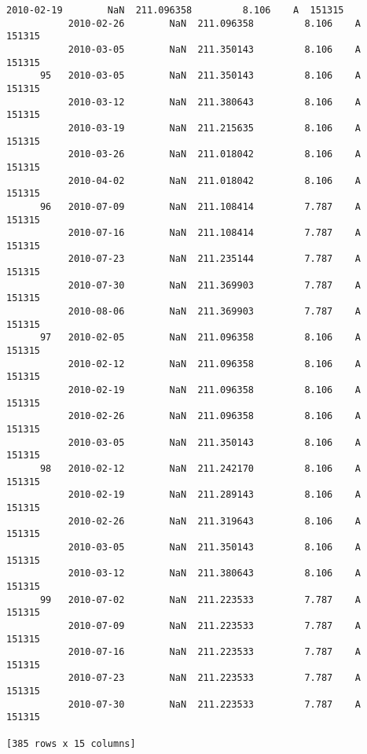 \documentclass[11pt]{article}
\begin{document}
\begin{Verbatim}[commandchars=\\\{\}]
           2010-02-19        NaN  211.096358         8.106    A  151315  
           2010-02-26        NaN  211.096358         8.106    A  151315  
           2010-03-05        NaN  211.350143         8.106    A  151315  
      95   2010-03-05        NaN  211.350143         8.106    A  151315  
           2010-03-12        NaN  211.380643         8.106    A  151315  
           2010-03-19        NaN  211.215635         8.106    A  151315  
           2010-03-26        NaN  211.018042         8.106    A  151315  
           2010-04-02        NaN  211.018042         8.106    A  151315  
      96   2010-07-09        NaN  211.108414         7.787    A  151315  
           2010-07-16        NaN  211.108414         7.787    A  151315  
           2010-07-23        NaN  211.235144         7.787    A  151315  
           2010-07-30        NaN  211.369903         7.787    A  151315  
           2010-08-06        NaN  211.369903         7.787    A  151315  
      97   2010-02-05        NaN  211.096358         8.106    A  151315  
           2010-02-12        NaN  211.096358         8.106    A  151315  
           2010-02-19        NaN  211.096358         8.106    A  151315  
           2010-02-26        NaN  211.096358         8.106    A  151315  
           2010-03-05        NaN  211.350143         8.106    A  151315  
      98   2010-02-12        NaN  211.242170         8.106    A  151315  
           2010-02-19        NaN  211.289143         8.106    A  151315  
           2010-02-26        NaN  211.319643         8.106    A  151315  
           2010-03-05        NaN  211.350143         8.106    A  151315  
           2010-03-12        NaN  211.380643         8.106    A  151315  
      99   2010-07-02        NaN  211.223533         7.787    A  151315  
           2010-07-09        NaN  211.223533         7.787    A  151315  
           2010-07-16        NaN  211.223533         7.787    A  151315  
           2010-07-23        NaN  211.223533         7.787    A  151315  
           2010-07-30        NaN  211.223533         7.787    A  151315  

[385 rows x 15 columns]

    \end{Verbatim}
\end{document}
